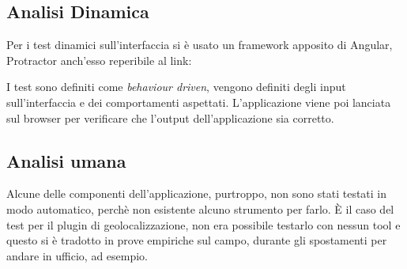 \subsection{Analisi Dinamica}
Per i test dinamici sull'interfaccia si è usato un framework apposito di Angular, Protractor anch'esso reperibile al link: \\
\begin{center}
  \cite{site:protractor}
\end{center}
I test sono definiti come \textit{behaviour driven}, vengono definiti degli input sull'interfaccia e dei comportamenti aspettati.
L'applicazione viene poi lanciata sul browser per verificare che l'output dell'applicazione sia corretto.

\subsection{Analisi umana}
Alcune delle componenti dell'applicazione, purtroppo, non sono stati testati in modo automatico, perchè non esistente alcuno strumento per
farlo. È il caso del test per il plugin di geolocalizzazione, non era possibile testarlo con nessun tool e questo si è tradotto in prove
empiriche sul campo, durante gli spostamenti per andare in ufficio, ad esempio.